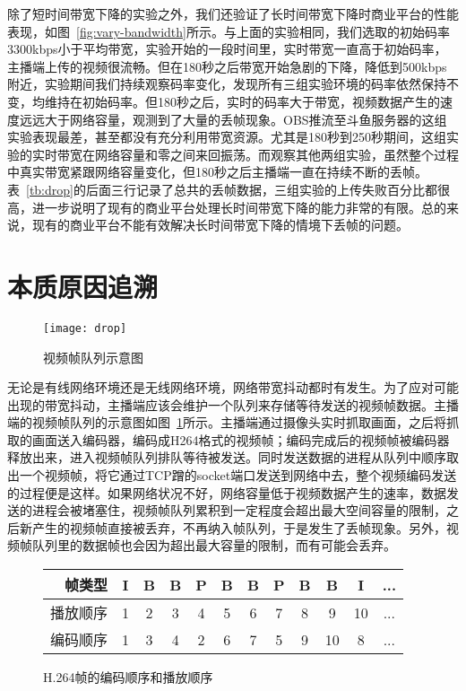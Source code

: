 除了短时间带宽下降的实验之外，我们还验证了长时间带宽下降时商业平台的性能表现，如图~\ref{fig:vary-bandwidth}所示。与上面的实验相同，我们选取的初始码率3300kbps小于平均带宽，实验开始的一段时间里，实时带宽一直高于初始码率，主播端上传的视频很流畅。但在180秒之后带宽开始急剧的下降，降低到500kbps附近，实验期间我们持续观察码率变化，发现所有三组实验环境的码率依然保持不变，均维持在初始码率。但180秒之后，实时的码率大于带宽，视频数据产生的速度远远大于网络容量，观测到了大量的丢帧现象。OBS推流至斗鱼服务器的这组实验表现最差，甚至都没有充分利用带宽资源。尤其是180秒到250秒期间，这组实验的实时带宽在网络容量和零之间来回振荡。而观察其他两组实验，虽然整个过程中真实带宽紧跟网络容量变化，但180秒之后主播端一直在持续不断的丢帧。表~\ref{tb:drop}的后面三行记录了总共的丢帧数据，三组实验的上传失败百分比都很高，进一步说明了现有的商业平台处理长时间带宽下降的能力非常的有限。总的来说，现有的商业平台不能有效解决长时间带宽下降的情境下丢帧的问题。

\section{本质原因追溯}

\begin{figure}[htb]%
  \centering
  \texttt{[image: drop]}
  \caption{视频帧队列示意图}
  \label{fig:drop}
\end{figure}

无论是有线网络环境还是无线网络环境，网络带宽抖动都时有发生。为了应对可能出现的带宽抖动，主播端应该会维护一个队列来存储等待发送的视频帧数据。主播端的视频帧队列的示意图如图~\ref{fig:drop}所示。主播端通过摄像头实时抓取画面，之后将抓取的画面送入编码器，编码成H264格式的视频帧；编码完成后的视频帧被编码器释放出来，进入视频帧队列排队等待被发送。同时发送数据的进程从队列中顺序取出一个视频帧，将它通过TCP蹭的socket端口发送到网络中去，整个视频编码发送的过程便是这样。如果网络状况不好，网络容量低于视频数据产生的速率，数据发送的进程会被堵塞住，视频帧队列累积到一定程度会超出最大空间容量的限制，之后新产生的视频帧直接被丢弃，不再纳入帧队列，于是发生了丢帧现象。另外，视频帧队列里的数据帧也会因为超出最大容量的限制，而有可能会丢弃。

\begin{figure}
\centering
{\setlength{\tabcolsep}{4pt}
\begin{tabular}{|r||ccccccccc|cc|}
\hline
帧类型       & I & B & B & P & B & B & P & B & B  & I  & ... \\ \hline
播放顺序   & 1 & 2 & 3 & 4 & 5 & 6 & 7 & 8 & 9  & 10 & ... \\ \hline
编码顺序 & 1 & 3 & 4 & 2 & 6 & 7 & 5 & 9 & 10 & 8  & ... \\
\hline
\end{tabular}}
\caption{H.264帧的编码顺序和播放顺序}
\label{fig:frame-order}
\end{figure}

